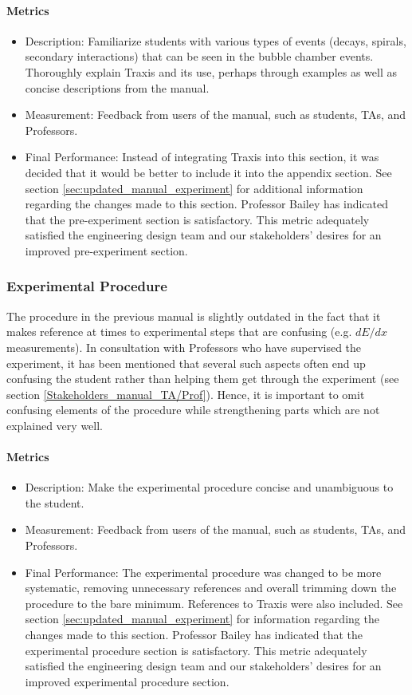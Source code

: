 \documentclass[12pt]{article} %
\begin{document}
\paragraph{Metrics}
\begin{itemize}
    \item Description: Familiarize students with various types of events (decays, spirals, secondary interactions) that can be seen in the bubble chamber events. Thoroughly explain Traxis and its use, perhaps through examples as well as concise descriptions from the manual.
    \item Measurement: Feedback from users of the manual, such as students, TAs, and Professors.
    \item Final Performance: Instead of integrating Traxis into this section, it was decided that it would be better to include it into the appendix section. See section \ref{sec:updated_manual_experiment} for additional information regarding the changes made to this section. Professor Bailey has indicated that the pre-experiment section is satisfactory. This metric adequately satisfied the engineering design team and our stakeholders’ desires for an improved pre-experiment section.
\end{itemize}

\subsubsection{Experimental Procedure}
The procedure in the previous manual is slightly outdated in the fact that it makes reference at times to experimental steps that are confusing (e.g. $dE/dx$ measurements). In consultation with Professors who have supervised the experiment, it has been mentioned that several such aspects often end up confusing the student rather than helping them get through the experiment (see section \ref{Stakeholders_manual_TA/Prof}). Hence, it is important to omit confusing elements of the procedure while strengthening parts which are not explained very well.

\paragraph{Metrics}
\begin{itemize}
    \item Description: Make the experimental procedure concise and unambiguous to the student.
    \item Measurement: Feedback from users of the manual, such as students, TAs, and Professors.
    \item Final Performance: The experimental procedure was changed to be more systematic, removing unnecessary references and overall trimming down the procedure to the bare minimum. References to Traxis were also included. See section \ref{sec:updated_manual_experiment} for information regarding the changes made to this section. Professor Bailey has indicated that the experimental procedure section is satisfactory. This metric adequately satisfied the engineering design team and our stakeholders’ desires for an improved experimental procedure section.
    
\end{itemize}
\end{document}
